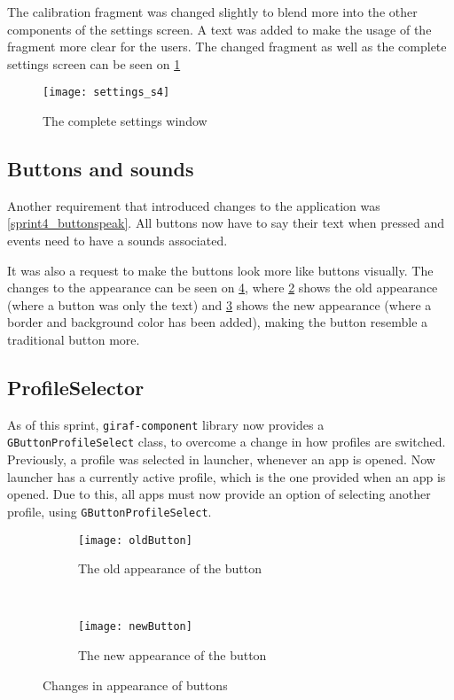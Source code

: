 The calibration fragment was changed slightly to blend more into the other components of the settings screen. 
A text was added to make the usage of the fragment more clear for the users.
The changed fragment as well as the complete settings screen can be seen on \cref{settings_s4}

\begin{figure}
\texttt{[image: settings\_s4]}
\caption{The complete settings window}
\label{settings_s4}
\end{figure}

\subsection{Buttons and sounds}\label{s4_buttonsounds}
Another requirement that introduced changes to the application was \cref{sprint4_buttonspeak}.
All buttons now have to say their text when pressed and events need to have a sounds associated.

It was also a request to make the buttons look more like buttons visually.
The changes to the appearance can be seen on \cref{Buttons}, where \cref{old} shows the old appearance (where a button was only the text) and \cref{new} shows the new appearance (where a border and background color has been added), making the button resemble a traditional button more.

\subsection{ProfileSelector}
As of this sprint, \lstinline|giraf-component| library now provides a \lstinline|GButtonProfileSelect| class, to overcome a change in how profiles are switched.
Previously, a profile was selected in launcher, whenever an app is opened.
Now launcher has a currently active profile, which is the one provided when an app is opened.
Due to this, all apps must now provide an option of selecting another profile, using \lstinline|GButtonProfileSelect|.

\begin{figure}
\begin{subfigure}{0.5\textwidth}
\centering
\texttt{[image: oldButton]}
\caption{The old appearance of the button}
\label{old}
\end{subfigure}
~
\begin{subfigure}{0.5\textwidth}
\centering
\texttt{[image: newButton]}
\caption{The new appearance of the button}
\label{new}
\end{subfigure}
\caption{Changes in appearance of buttons}
\label{Buttons}
\end{figure}